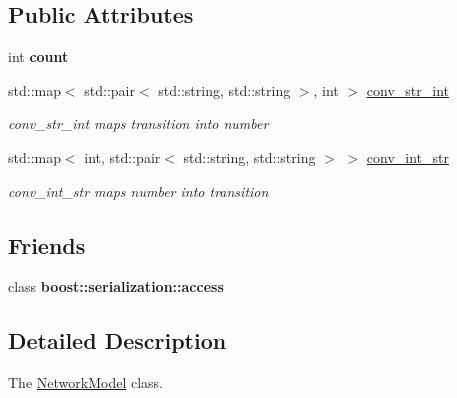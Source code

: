 \subsection*{Public Attributes}
\begin{DoxyCompactItemize}
\item 
int {\bfseries count}\hypertarget{class_network_model_a82ec303222e3a0207865dfb6ed3b81ff}{}\label{class_network_model_a82ec303222e3a0207865dfb6ed3b81ff}

\item 
std\+::map$<$ std\+::pair$<$ std\+::string, std\+::string $>$, int $>$ \hyperlink{class_network_model_a826def67a5afb8534a1a32c7a8eba84a}{conv\+\_\+str\+\_\+int}\hypertarget{class_network_model_a826def67a5afb8534a1a32c7a8eba84a}{}\label{class_network_model_a826def67a5afb8534a1a32c7a8eba84a}

\begin{DoxyCompactList}\small\item\em conv\+\_\+str\+\_\+int maps transition into number \end{DoxyCompactList}\item 
std\+::map$<$ int, std\+::pair$<$ std\+::string, std\+::string $>$ $>$ \hyperlink{class_network_model_af008577d60bc685e58c181b85142eccf}{conv\+\_\+int\+\_\+str}\hypertarget{class_network_model_af008577d60bc685e58c181b85142eccf}{}\label{class_network_model_af008577d60bc685e58c181b85142eccf}

\begin{DoxyCompactList}\small\item\em conv\+\_\+int\+\_\+str maps number into transition \end{DoxyCompactList}\end{DoxyCompactItemize}
\subsection*{Friends}
\begin{DoxyCompactItemize}
\item 
class {\bfseries boost\+::serialization\+::access}\hypertarget{class_network_model_ac98d07dd8f7b70e16ccb9a01abf56b9c}{}\label{class_network_model_ac98d07dd8f7b70e16ccb9a01abf56b9c}

\end{DoxyCompactItemize}


\subsection{Detailed Description}
The \hyperlink{class_network_model}{Network\+Model} class. 

